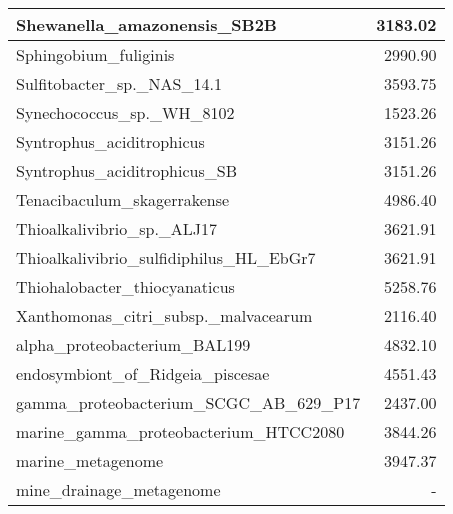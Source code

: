\documentclass[12pt,a4paper]{article}
\begin{document}
\begin{table}[ht]
\begin{center}
\begin{tabular}{|l*{1}{|r}|}
Shewanella\_amazonensis\_SB2B & 3183.02 \\ \hline
Sphingobium\_fuliginis & 2990.90 \\ \hline
Sulfitobacter\_sp.\_NAS\_14.1 & 3593.75 \\ \hline
Synechococcus\_sp.\_WH\_8102 & 1523.26 \\ \hline
Syntrophus\_aciditrophicus & 3151.26 \\ \hline
Syntrophus\_aciditrophicus\_SB & 3151.26 \\ \hline
Tenacibaculum\_skagerrakense & 4986.40 \\ \hline
Thioalkalivibrio\_sp.\_ALJ17 & 3621.91 \\ \hline
Thioalkalivibrio\_sulfidiphilus\_HL\_EbGr7 & 3621.91 \\ \hline
Thiohalobacter\_thiocyanaticus & 5258.76 \\ \hline
Xanthomonas\_citri\_subsp.\_malvacearum & 2116.40 \\ \hline
alpha\_proteobacterium\_BAL199 & 4832.10 \\ \hline
endosymbiont\_of\_Ridgeia\_piscesae & 4551.43 \\ \hline
gamma\_proteobacterium\_SCGC\_AB\_629\_P17 & 2437.00 \\ \hline
marine\_gamma\_proteobacterium\_HTCC2080 & 3844.26 \\ \hline
marine\_metagenome & 3947.37 \\ \hline
mine\_drainage\_metagenome & - \\ \hline
\end{tabular}
\end{center}
\end{table}
\end{document}
